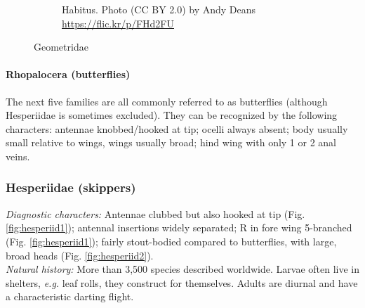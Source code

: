 \documentclass[letterpaper, 11pt]{article}
\begin{document}
\begin{figure}[ht!]
\begin{subfigure}[ht!]{0.57\textwidth}
        \caption{Habitus. Photo (CC BY 2.0) by Andy Deans \url{https://flic.kr/p/FHd2FU}}
        \label{fig:geometrid2}
    \end{subfigure}
    \caption{Geometridae}\label{fig:geometrids}
\end{figure}


\FloatBarrier
\paragraph{Rhopalocera (butterflies)} The next five families are all commonly referred to as butterflies (although Hesperiidae is sometimes excluded). They can be recognized by the following characters: antennae knobbed/hooked at tip; ocelli always absent; body usually small relative to wings, wings usually broad; hind wing with only 1 or 2 anal veins.

\subsubsection{Hesperiidae (skippers)}
\noindent{}\textit{Diagnostic characters:} Antennae clubbed but also hooked at tip (Fig. \ref{fig:hesperiid1}); antennal insertions widely separated; R in fore wing 5-branched (Fig. \ref{fig:hesperiid1}); fairly stout-bodied compared to butterflies, with large, broad heads (Fig. \ref{fig:hesperiid2}).\\

\noindent{}\textit{Natural history:} More than 3,500 species described worldwide. Larvae often live in shelters, \textit{e.g.} leaf rolls, they construct for themselves. Adults are diurnal and have a characteristic darting flight.

\end{document}

